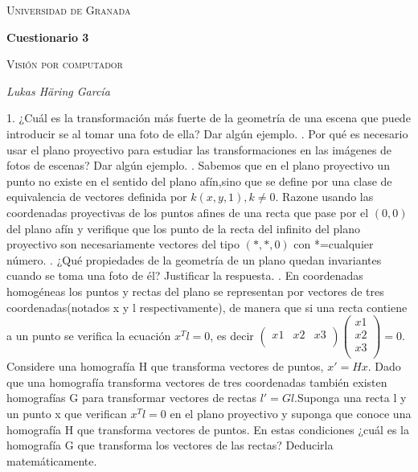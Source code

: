 \documentclass[12pt,a4paper]{article}
\begin{document}
	\begin{titlepage}
		\centering
		{\scshape\LARGE Universidad de Granada \par}
		{\large \date{\specialdate\today}\par}
		\vspace{1cm}
		{\LARGE\bfseries Cuestionario 3\par}
		\vspace{1.5cm}
		{\scshape\large Visión por computador\par}
		\vspace{2cm}
		{\Large\itshape Lukas Häring García\par}
	\end{titlepage}
	
	
	\newpage
	
	1. ¿Cuál es la transformación más fuerte de la geometría de una escena que puede introducir se al tomar una foto de ella? Dar algún ejemplo.
	. Por qué es necesario usar el plano proyectivo para estudiar las transformaciones en las imágenes de fotos de escenas? Dar algún ejemplo.
	. Sabemos que en el plano proyectivo un punto no existe en el sentido del plano afín,sino que se define por una clase de equivalencia de vectores definida por ${k(x,y,1),k\ne 0}$. Razone usando las coordenadas proyectivas de los puntos afines de una recta que pase por el $(0,0)$ del plano afín y verifique que los punto de la recta del infinito del plano proyectivo son necesariamente vectores del tipo $(*,*,0)$ con *=cualquier número.
	. ¿Qué propiedades de la geometría de un plano quedan invariantes cuando se toma una foto de él? Justificar la respuesta.
	. En  coordenadas  homogéneas  los  puntos y  rectas  del  plano  se representan  por  vectores  de  tres  coordenadas(notados  x  y  l respectivamente), de manera que si una recta contiene a un punto se verifica la ecuación $x^Tl=0$, es decir 
	$\begin{pmatrix}
		x1 & x2 & x3\\
	\end{pmatrix}
	\begin{pmatrix}
		x1 \\ x2 \\ x3\\
	\end{pmatrix} = 0$. 
	Considere una homografía H que transforma vectores de puntos, $x'=Hx$. Dado que una homografía transforma vectores de tres coordenadas también existen homografías G para transformar vectores de rectas $l'=Gl$.Suponga una recta l y un punto x que verifican $x^Tl=0$ en el plano proyectivo y suponga  que  conoce  una  homografía  H  que transforma vectores  de puntos. En estas condiciones ¿cuál es la homografía G que transforma los vectores de las rectas? Deducirla matemáticamente.
\end{document}
